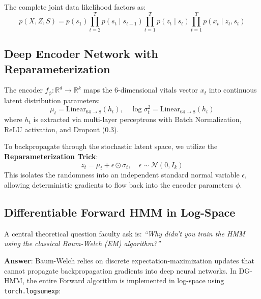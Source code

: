 \documentclass[11pt,a4paper]{article}
\begin{document}
The complete joint data likelihood factors as:
\begin{equation}
    p(X, Z, S) = p(s_1) \prod_{t=2}^T p(s_t \mid s_{t-1}) \prod_{t=1}^T p(z_t \mid s_t) \prod_{t=1}^T p(x_t \mid z_t, s_t)
\end{equation}

\subsection{Deep Encoder Network with Reparameterization}
The encoder $f_\phi: \mathbb{R}^d \to \mathbb{R}^k$ maps the 6-dimensional vitals vector $x_t$ into continuous latent distribution parameters:
\begin{equation}
    \mu_t = \text{Linear}_{64 \to 8}(h_t), \quad \log \sigma_t^2 = \text{Linear}_{64 \to 8}(h_t)
\end{equation}
where $h_t$ is extracted via multi-layer perceptrons with Batch Normalization, ReLU activation, and Dropout (0.3).

To backpropagate through the stochastic latent space, we utilize the \textbf{Reparameterization Trick}:
\begin{equation}
    z_t = \mu_t + \epsilon \odot \sigma_t, \quad \epsilon \sim \mathcal{N}(0, I_k)
\end{equation}
This isolates the randomness into an independent standard normal variable $\epsilon$, allowing deterministic gradients to flow back into the encoder parameters $\phi$.

\subsection{Differentiable Forward HMM in Log-Space}
A central theoretical question faculty ask is: \textit{``Why didn't you train the HMM using the classical Baum-Welch (EM) algorithm?''}

\textbf{Answer}: Baum-Welch relies on discrete expectation-maximization updates that cannot propagate backpropagation gradients into deep neural networks. In DG-HMM, the entire Forward algorithm is implemented in log-space using \texttt{torch.logsumexp}:
\end{document}
